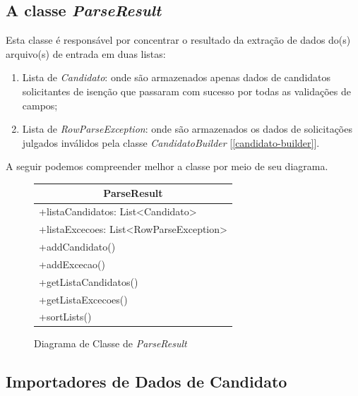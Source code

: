 \documentclass[
	12pt,			%
	openright,		%
	oneside,	
	a4paper,		%
	english,		%
	brazil			%
]{abntex2/abntex2}  %
\begin{document}
			\subsection{A classe \textit{ParseResult}} \label{cap-parse-result}
	
				Esta classe é responsável por concentrar o resultado da extração de dados do(s) arquivo(s) de entrada em duas listas:
		
				\begin{enumerate}
						
					\item Lista de \textit{Candidato}: onde são armazenados apenas dados de candidatos solicitantes de isenção que passaram com sucesso por todas as validações de campos;
					\item Lista de \textit{RowParseException}: onde são armazenados os dados de solicitações julgados inválidos pela classe \textit{CandidatoBuilder} [\ref{candidato-builder}].
						
				\end{enumerate}
	
				A seguir podemos compreender melhor a classe por meio de seu diagrama.
	
				\begin{figure}[h]
					\begin{center}
						
						\caption{Diagrama de Classe de \textit{ParseResult}}
						\label{parseresult-uml}
						
						\begin{tabular}{|l|}
							\hline
							\multicolumn{1}{|c|}{\textbf{ParseResult}} \\ \hline
							+listaCandidatos: List\textless{}Candidato\textgreater{} \\
							+listaExcecoes: List\textless{}RowParseException\textgreater{} \\ \hline
							+addCandidato() \\
							+addExcecao() \\
							+getListaCandidatos() \\
							+getListaExcecoes() \\
							+sortLists() \\ \hline
						\end{tabular}
						
					\end{center}
				\end{figure}
	
			\subsection{Importadores de Dados de Candidato}
	
\end{document}
